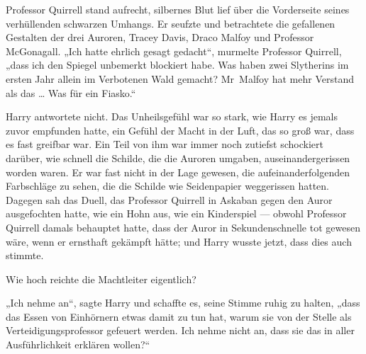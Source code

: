 Professor Quirrell stand aufrecht, silbernes Blut lief über die Vorderseite seines verhüllenden schwarzen Umhangs. Er seufzte und betrachtete die gefallenen Gestalten der drei Auroren, Tracey Davis, Draco Malfoy und Professor McGonagall.
„Ich hatte ehrlich gesagt gedacht“, murmelte Professor Quirrell, „dass ich den Spiegel unbemerkt blockiert habe. Was haben zwei Slytherins im ersten Jahr allein im Verbotenen Wald gemacht? Mr~Malfoy hat mehr Verstand als das … Was für ein Fiasko.“

Harry antwortete nicht. Das Unheilsgefühl war so stark, wie Harry es jemals zuvor empfunden hatte, ein Gefühl der Macht in der Luft, das so groß war, dass es fast greifbar war. Ein Teil von ihm war immer noch zutiefst schockiert darüber, wie schnell die Schilde, die die Auroren umgaben, auseinandergerissen worden waren. Er war fast nicht in der Lage gewesen, die aufeinanderfolgenden Farbschläge zu sehen, die die Schilde wie Seidenpapier weggerissen hatten. Dagegen sah das Duell, das Professor Quirrell in Askaban gegen den Auror ausgefochten hatte, wie ein Hohn aus, wie ein Kinderspiel — obwohl Professor Quirrell damals behauptet hatte, dass der Auror in Sekundenschnelle tot gewesen wäre, wenn er ernsthaft gekämpft hätte; und Harry wusste jetzt, dass dies auch stimmte.

Wie hoch reichte die Machtleiter eigentlich?

„Ich nehme an“, sagte Harry und schaffte es, seine Stimme ruhig zu halten, „dass das Essen von Einhörnern etwas damit zu tun hat, warum sie von der Stelle als Verteidigungsprofessor gefeuert werden. Ich nehme nicht an, dass sie das in aller Ausführlichkeit erklären wollen?“

